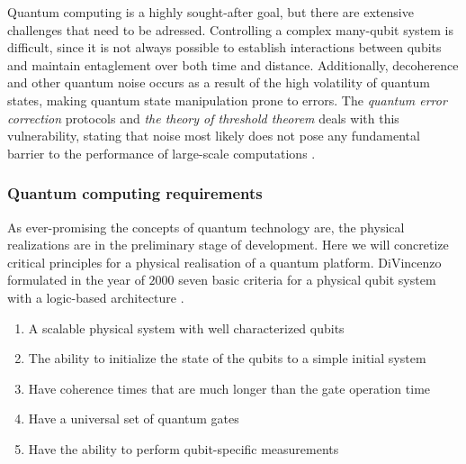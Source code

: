 
Quantum computing is a highly sought-after goal, but there are extensive challenges that need to be adressed. Controlling a complex many-qubit system is difficult, since it is not always possible to establish interactions between qubits \cite{DiVincenzo2000} and maintain entaglement over both time and distance. Additionally, decoherence and other quantum noise occurs as a result of the high volatility of quantum states, making quantum state manipulation prone to errors. The \textit{quantum error correction} protocols and \textit{the theory of threshold theorem} \cite{Pavicic2006, Gottesman2009} deals with this vulnerability, stating that noise most likely does not pose any fundamental barrier to the performance of large-scale computations \cite{Pavicic2006}.


\subsubsection{Quantum computing requirements}
As ever-promising the concepts of quantum technology are, the physical realizations are in the preliminary stage of development. Here we will concretize critical principles for a physical realisation of a quantum platform. DiVincenzo formulated in the year of $2000$ seven basic criteria for a physical qubit system with a logic-based architecture \cite{DiVincenzo2000}.



\begin{enumerate}
  \item A scalable physical system with well characterized qubits
  \item The ability to initialize the state of the qubits to a simple initial system
  \item Have coherence times that are much longer than the gate operation time
  \item Have a universal set of quantum gates
  \item Have the ability to perform qubit-specific measurements
\end{enumerate}

